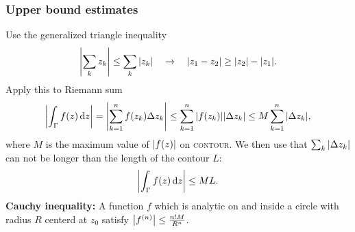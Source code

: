 \documentclass[a4paper, 10pt]{article}
\newcommand*\diff{\mathop{}\!\mathrm{d}}
\begin{document}
\begin{multicols*}{3}
\subsubsection*{\scriptsize Upper bound estimates}
Use the generalized triangle inequality
\begin{align*}
  \abs{\sum_k z_k } \leq \sum_k \abs{z_k}\quad \rightarrow \quad
  \abs{z_1-z_2} \geq \abs{z_2}-\abs{z_1}.
\end{align*}
Apply this to Riemann sum
\begin{align*}
  \abs{\int_\Gamma f(z) \diff z} = \abs{\sum_{k=1}^{n} f(z_k) \Delta z_k} \leq \sum_{k=1}^{n} \abs{f(z_k)} \abs{\Delta z_k} \leq M \sum_{k=1}^{n} \abs{\Delta z_k},
\end{align*}
where $M$ is the maximum value of $\abs{f(z)}$ on \textsc{contour}. We then use that $\sum_k \abs{\Delta z_k}$ can not be longer than the length of the contour $L$:
\begin{equation*}
  \abs{\int_\Gamma f(z) \diff z} \leq ML.
\end{equation*}
\textbf{Cauchy inequality:} A function $f$ which is analytic on and inside a circle with radius $R$ centerd at $z_0$ satisfy $\abs{f^{(n)}} \leq \frac{n!M}{R^n}$.

\end{multicols*}
\end{document}
